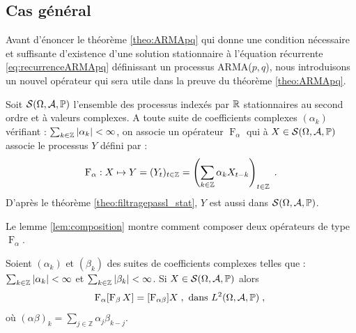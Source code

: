 \subsection{Cas g\'en\'eral}\label{sec:cas_general}
Avant d'\'enoncer le th\'eor\`eme \ref{theo:ARMApq} qui donne
une condition n\'ecessaire et suffisante d'existence d'une solution stationnaire
\`a l'\'equation r\'ecurrente \eqref{eq:recurrenceARMApq}
d\'efinissant un processus ARMA($p,q$), nous introduisons un nouvel op\'erateur
qui sera utile dans la preuve du th\'eor\`eme \ref{theo:ARMApq}.

Soit $\mathcal{S}(\Omega,\mathcal{A},\mathbb{P})$ l'ensemble des processus index\'es par $\mathbb{R}$
stationnaires au second ordre et \`a valeurs complexes. A toute suite de
coefficients complexes $(\alpha_k)$ v\'erifiant :
$\sum_{k\in\mathbb{Z}}|\alpha_k|<\infty$, on associe un op\'erateur
$\operatorname{F}_\alpha$ qui \`a $X\in\mathcal{S}(\Omega,\mathcal{A},\mathbb{P})$ associe le processus $Y$
d\'efini par :
$$
\operatorname{F}_\alpha:X\mapsto Y=(Y_t)_{t\in\mathbb{Z}}=\left(\sum_{k\in\mathbb{Z}}\alpha_k X_{t-k}\right)_{t\in\mathbb{Z}}\; .
$$
D'apr\`es le th\'eor\`eme \ref{theo:filtragepassl_stat}, $Y$ est aussi dans $\mathcal{S}(\Omega,\mathcal{A},\mathbb{P})$.

Le lemme \ref{lem:composition} montre comment composer deux op\'erateurs
de type $\operatorname{F}_\alpha$.

\begin{lemma}\label{lem:composition}
  Soient $(\alpha_k)$ et $(\beta_k)$ des suites de coefficients complexes
  telles que : $\sum_{k\in\mathbb{Z}}|\alpha_k|<\infty$ et
  $\sum_{k\in\mathbb{Z}}|\beta_k|<\infty$.  Si $X\in\mathcal{S}(\Omega,\mathcal{A},\mathbb{P})$ alors
$$
\operatorname{F}_{\alpha}[\operatorname{F}_{\beta}X]=[\operatorname{F}_{\alpha\beta}]X\;, \textrm{
  dans } L^2(\Omega,\mathcal{A},\mathbb{P})\;,\;
$$
o\`u $(\alpha\beta)_k=\sum_{j\in\mathbb{Z}}\alpha_j\beta_{k-j}$.
\end{lemma}

